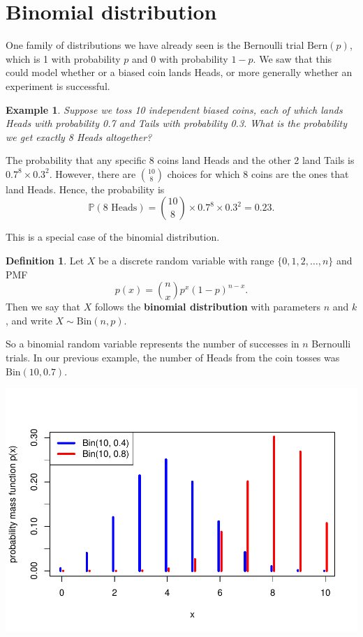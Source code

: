 \documentclass[
  a4paper,
]{book}
\theoremstyle{definition}
\newtheorem{definition}{Definition}[chapter]
\theoremstyle{definition}
\newtheorem{example}{Example}[chapter]
\theoremstyle{definition}
\theoremstyle{definition}
\theoremstyle{remark}
\begin{document}
\hypertarget{binomial}{%
\section{Binomial distribution}\label{binomial}}

One family of distributions we have already seen is the Bernoulli trial \(\text{Bern}(p)\), which is 1 with probability \(p\) and 0 with probability \(1-p\). We saw that this could model whether or a biased coin lands Heads, or more generally whether an experiment is successful.

\begin{example}
\emph{Suppose we toss 10 independent biased coins, each of which lands Heads with probability 0.7 and Tails with probability 0.3. What is the probability we get exactly 8 Heads altogether?}

The probability that any specific 8 coins land Heads and the other 2 land Tails is \(0.7^8\times 0.3^2\). However, there are \(\binom{10}{8}\) choices for which 8 coins are the ones that land Heads. Hence, the probability is
\[ \mathbb P(\text{8 Heads}) = \binom{10}{8} \times 0.7^8 \times 0.3^2 = 0.23.\]
\end{example}

This is a special case of the binomial distribution.

\begin{definition}
Let \(X\) be a discrete random variable with range \(\{0,1,2,\dots,n\}\) and PMF
\[ p(x) = \binom{n}{x} p^x (1-p)^{n-x} . \]
Then we say that \(X\) follows the \textbf{binomial distribution} with parameters \(n\) and \(k\), and write \(X \sim \text{Bin}(n,p)\).
\end{definition}

So a binomial random variable represents the number of successes in \(n\) Bernoulli trials. In our previous example, the number of Heads from the coin tosses was \(\text{Bin}(10, 0.7)\).

\includegraphics{math1710_files/figure-latex/binom-pic-1.pdf}
\end{document}
